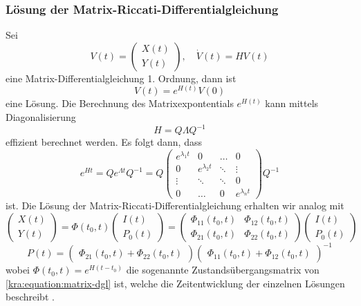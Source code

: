 \subsubsection{Lösung der Matrix-Riccati-Differentialgleichung}
Sei
\[
    V(t)
    =
    \begin{pmatrix}
        X(t) \\
        Y(t)
    \end{pmatrix},
    \quad
    \dot{V}(t) = HV(t)
\]
eine Matrix-Differentialgleichung 1. Ordnung, dann ist
\[
    V(t) = e^{H(t)} V(0)
\]
eine Lösung.
Die Berechnung des Matrixexpontentials $e^{H(t)}$ kann mittels Diagonalisierung
\[
    H = Q \Lambda Q^{-1}
\]
effizient berechnet werden.
Es folgt dann, dass
\[
    e^{Ht}
    =
    Q
    e^{\Lambda t}
    Q^{-1}
    =
    Q
    \begin{pmatrix}
        e^{\lambda_1 t} & 0               & \dots  & 0               \\
        0               & e^{\lambda_2 t} & \ddots & \vdots          \\
        \vdots          & \ddots          & \ddots & 0               \\
        0               & \dots           & 0      & e^{\lambda_n t}
    \end{pmatrix}
    Q^{-1}
\]
ist. Die Lösung der Matrix-Riccati-Differentialgleichung erhalten wir analog mit
\begin{equation}
    \label{kra:matrixriccati-solution}
    \begin{pmatrix}
        X(t) \\
        Y(t)
    \end{pmatrix}
    =
    \Phi(t_0, t)
    \begin{pmatrix}
        I(t) \\
        P_0(t)
    \end{pmatrix}
    =
    \begin{pmatrix}
        \Phi_{11}(t_0, t) & \Phi_{12}(t_0, t) \\
        \Phi_{21}(t_0, t) & \Phi_{22}(t_0, t)
    \end{pmatrix}
    \begin{pmatrix}
        I(t) \\
        P_0(t)
    \end{pmatrix}
\end{equation}
\begin{equation}
    P(t) =
    \begin{pmatrix}
        \Phi_{21}(t_0, t) + \Phi_{22}(t_0, t)
    \end{pmatrix}
    \begin{pmatrix}
        \Phi_{11}(t_0, t) + \Phi_{12}(t_0, t)
    \end{pmatrix}
    ^{-1}
\end{equation}
wobei $\Phi(t_0, t) = e^{H(t - t_0)}$ die sogenannte Zustandsübergangsmatrix von \eqref{kra:equation:matrix-dgl} ist,
welche die Zeitentwicklung der einzelnen Lösungen beschreibt \cite{kra:kalmanisae}.
